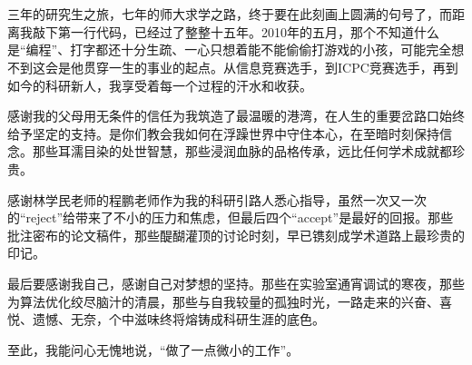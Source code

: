 { 
  \chapter*{\LARGE{}}

  

三年的研究生之旅，七年的师大求学之路，终于要在此刻画上圆满的句号了，而距离我敲下第一行代码，已经过了整整十五年。2010年的五月，那个不知道什么是“编程”、打字都还十分生疏、一心只想着能不能偷偷打游戏的小孩，可能完全想不到这会是他贯穿一生的事业的起点。从信息竞赛选手，到ICPC竞赛选手，再到如今的科研新人，我享受着每一个过程的汗水和收获。

感谢我的父母用无条件的信任为我筑造了最温暖的港湾，在人生的重要岔路口始终给予坚定的支持。是你们教会我如何在浮躁世界中守住本心，在至暗时刻保持信念。那些耳濡目染的处世智慧，那些浸润血脉的品格传承，远比任何学术成就都珍贵。

感谢林学民老师的程鹏老师作为我的科研引路人悉心指导，虽然一次又一次的“reject”给带来了不小的压力和焦虑，但最后四个“accept”是最好的回报。那些批注密布的论文稿件，那些醍醐灌顶的讨论时刻，早已镌刻成学术道路上最珍贵的印记。

最后要感谢我自己，感谢自己对梦想的坚持。那些在实验室通宵调试的寒夜，那些为算法优化绞尽脑汁的清晨，那些与自我较量的孤独时光，一路走来的兴奋、喜悦、遗憾、无奈，个中滋味终将熔铸成科研生涯的底色。

至此，我能问心无愧地说，“做了一点微小的工作”。



  \hspace{8cm}
}